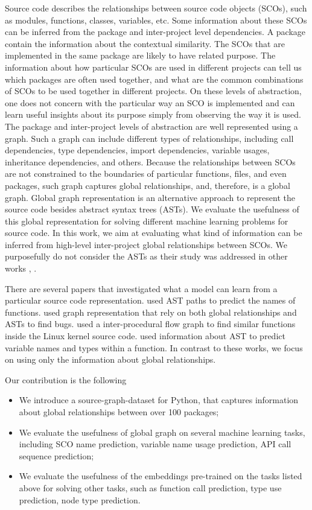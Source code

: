 \documentclass[a4paper,twoside]{article}
\begin{document}
Source code describes the relationships between source code objects (SCOs), such as modules, functions, classes, variables, etc. Some information about these SCOs can be inferred from the package and inter-project level dependencies. A package contain the information about the contextual similarity. The SCOs that are implemented in the same package are likely to have related purpose. The information about how particular SCOs are used in different projects can tell us which packages are often used together, and what are the common combinations of SCOs to be used together in different projects. On these levels of abstraction, one does not concern with the particular way an SCO is implemented and can learn useful insights about its purpose simply from observing the way it is used. 
The package and inter-project levels of abstraction are well represented using a graph. Such a graph can include different types of relationships, including call dependencies, type dependencies, import dependencies, variable usages, inheritance dependencies, and others. Because the relationships between SCOs are not constrained to the boundaries of particular functions, files, and even packages, such graph captures global relationships, and, therefore, is a global graph. Global graph representation is an alternative approach to represent the source code besides abstract syntax trees (ASTs). We evaluate the usefulness of this global representation for solving different machine learning problems for source code. In this work, we aim at evaluating what kind of information can be inferred from high-level inter-project global relationships between SCOs. We purposefully do not consider the ASTs as their study was addressed in other works \cite{Alon2018}, \cite{Yahav2018}.

There are several papers that investigated what a model can learn from a particular source code representation. \cite{Alon2018a} used AST paths to predict the names of functions. \cite{Allamanis2017} used graph representation that rely on both global relationships and ASTs to find bugs. \cite{DeFreez2018} used a inter-procedural flow graph to find similar functions inside the Linux kernel source code. \cite{Raychev2015} used information about AST to predict variable names and types within a function. In contrast to these works, we focus on using only the information about global relationships. 

Our contribution is the following
\begin{itemize}
    \item We introduce a source-graph-dataset for Python, that captures information about global relationships between over 100 packages;
    \item We evaluate the usefulness of global graph on several machine learning tasks, including SCO name prediction, variable name usage prediction, API call sequence prediction;
    \item We evaluate the usefulness of the embeddings pre-trained on the tasks listed above for solving other tasks, such as function call prediction, type use prediction, node type prediction.
\end{itemize}
\end{document}
